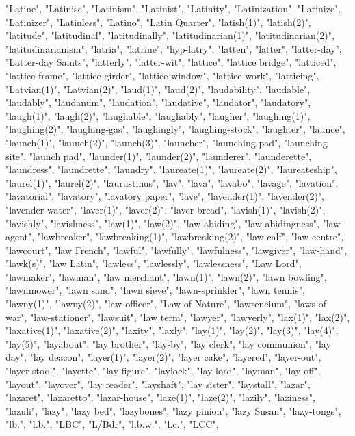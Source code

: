 "Latine",
"Latinise",
"Latinism",
"Latinist",
"Latinity",
"Latinization",
"Latinize",
"Latinizer",
"Latinless",
"Latino",
"Latin Quarter",
"latish(1)",
"latish(2)",
"latitude",
"latitudinal",
"latitudinally",
"latitudinarian(1)",
"latitudinarian(2)",
"latitudinarianism",
"latria",
"latrine",
"hyp-latry",
"latten",
"latter",
"latter-day",
"Latter-day Saints",
"latterly",
"latter-wit",
"lattice",
"lattice bridge",
"latticed",
"lattice frame",
"lattice girder",
"lattice window",
"lattice-work",
"latticing",
"Latvian(1)",
"Latvian(2)",
"laud(1)",
"laud(2)",
"laudability",
"laudable",
"laudably",
"laudanum",
"laudation",
"laudative",
"laudator",
"laudatory",
"laugh(1)",
"laugh(2)",
"laughable",
"laughably",
"laugher",
"laughing(1)",
"laughing(2)",
"laughing-gas",
"laughingly",
"laughing-stock",
"laughter",
"launce",
"launch(1)",
"launch(2)",
"launch(3)",
"launcher",
"launching pad",
"launching site",
"launch pad",
"launder(1)",
"launder(2)",
"launderer",
"launderette",
"laundress",
"laundrette",
"laundry",
"laureate(1)",
"laureate(2)",
"laureateship",
"laurel(1)",
"laurel(2)",
"laurustinus",
"lav",
"lava",
"lavabo",
"lavage",
"lavation",
"lavatorial",
"lavatory",
"lavatory paper",
"lave",
"lavender(1)",
"lavender(2)",
"lavender-water",
"laver(1)",
"laver(2)",
"laver bread",
"lavish(1)",
"lavish(2)",
"lavishly",
"lavishness",
"law(1)",
"law(2)",
"law-abiding",
"law-abidingness",
"law agent",
"lawbreaker",
"lawbreaking(1)",
"lawbreaking(2)",
"law calf",
"law centre",
"lawcourt",
"law French",
"lawful",
"lawfully",
"lawfulness",
"lawgiver",
"law-hand",
"lawk(s)",
"law Latin",
"lawless",
"lawlessly",
"lawlessness",
"Law Lord",
"lawmaker",
"lawman",
"law merchant",
"lawn(1)",
"lawn(2)",
"lawn bowling",
"lawnmower",
"lawn sand",
"lawn sieve",
"lawn-sprinkler",
"lawn tennis",
"lawny(1)",
"lawny(2)",
"law officer",
"Law of Nature",
"lawrencium",
"laws of war",
"law-stationer",
"lawsuit",
"law term",
"lawyer",
"lawyerly",
"lax(1)",
"lax(2)",
"laxative(1)",
"laxative(2)",
"laxity",
"laxly",
"lay(1)",
"lay(2)",
"lay(3)",
"lay(4)",
"lay(5)",
"layabout",
"lay brother",
"lay-by",
"lay clerk",
"lay communion",
"lay day",
"lay deacon",
"layer(1)",
"layer(2)",
"layer cake",
"layered",
"layer-out",
"layer-stool",
"layette",
"lay figure",
"laylock",
"lay lord",
"layman",
"lay-off",
"layout",
"layover",
"lay reader",
"layshaft",
"lay sister",
"laystall",
"lazar",
"lazaret",
"lazaretto",
"lazar-house",
"laze(1)",
"laze(2)",
"lazily",
"laziness",
"lazuli",
"lazy",
"lazy bed",
"lazybones",
"lazy pinion",
"lazy Susan",
"lazy-tongs",
"lb.",
"l.b.",
"LBC",
"L/Bdr",
"l.b.w.",
"l.c.",
"LCC",
